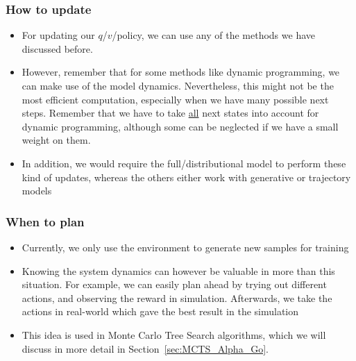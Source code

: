 \subsubsection{How to update}
\begin{itemize}
	\item For updating our $q$/$v$/policy, we can use any of the methods we have discussed before. 
	\item However, remember that for some methods like dynamic programming, we can make use of the model dynamics. Nevertheless, this might not be the most efficient computation, especially when we have many possible next steps. Remember that we have to take \underline{all} next states into account for dynamic programming, although some can be neglected if we have a small weight on them. 
	\item In addition, we would require the full/distributional model to perform these kind of updates, whereas the others either work with generative or trajectory models
\end{itemize}
\subsubsection{When to plan}
\begin{itemize}
	\item Currently, we only use the environment to generate new samples for training
	\item Knowing the system dynamics can however be valuable in more than this situation. For example, we can easily plan ahead by trying out different actions, and observing the reward in simulation. Afterwards, we take the actions in real-world which gave the best result in the simulation
	\item This idea is used in Monte Carlo Tree Search algorithms, which we will discuss in more detail in Section~\ref{sec:MCTS_Alpha_Go}. 
\end{itemize}
